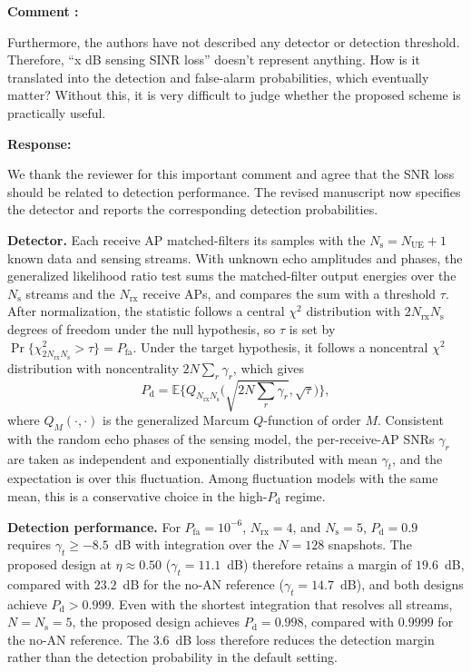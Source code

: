 \documentclass[a4paper,12pt]{article}
\newcounter{reviewcomment}
\newenvironment{reviewcomment}{%
  \stepcounter{reviewcomment}%
  \begin{shaded}
  \textbf{Comment \thereviewcomment:}\par
}{\end{shaded}}
\newenvironment{response}{\par\textbf{Response:}\par}{\par}
\begin{document}
\begin{reviewcomment}
Furthermore, the authors have not described any detector or detection
threshold. Therefore, ``x dB sensing SINR loss'' doesn't represent anything.
How is it translated into the detection and false-alarm probabilities,
which eventually matter? Without this, it is very difficult to judge whether
the proposed scheme is practically useful.
\end{reviewcomment}
\begin{response}
We thank the reviewer for this important comment and agree that the SNR loss
should be related to detection performance. The revised manuscript now
specifies the detector and reports the corresponding detection
probabilities.

\textbf{Detector.} Each receive AP matched-filters its samples with the
$N_{\mathrm{s}}=N_{\mathrm{UE}}+1$ known data and sensing streams. With
unknown echo amplitudes and phases, the generalized likelihood ratio test
sums the matched-filter output energies over the $N_{\mathrm{s}}$ streams and
the $N_{\mathrm{rx}}$ receive APs, and compares the sum with a threshold
$\tau$. After normalization, the statistic follows a central $\chi^2$
distribution with $2N_{\mathrm{rx}}N_{\mathrm{s}}$ degrees of freedom under
the null hypothesis, so $\tau$ is set by
$\Pr\{\chi^2_{2N_{\mathrm{rx}}N_{\mathrm{s}}}>\tau\}=P_{\mathrm{fa}}$. Under
the target hypothesis, it follows a noncentral $\chi^2$ distribution with
noncentrality $2N\sum_r\gamma_r$, which gives
\begin{equation*}
P_{\mathrm{d}}=\mathbb{E}\Big\{Q_{N_{\mathrm{rx}}N_{\mathrm{s}}}\Big(\sqrt{2N{\textstyle\sum_r}\gamma_r},\sqrt{\tau}\Big)\Big\},
\end{equation*}
where $Q_{M}(\cdot,\cdot)$ is the generalized Marcum $Q$-function of order
$M$. Consistent with the random echo phases of the sensing model, the
per-receive-AP SNRs $\gamma_r$ are taken as independent and exponentially
distributed with mean $\gamma_t$, and the expectation is over this
fluctuation. Among fluctuation models with the same mean, this is a
conservative choice in the high-$P_{\mathrm{d}}$ regime.

\textbf{Detection performance.} For $P_{\mathrm{fa}}=10^{-6}$,
$N_{\mathrm{rx}}=4$, and $N_{\mathrm{s}}=5$, $P_{\mathrm{d}}=0.9$ requires
$\gamma_t\ge-8.5$~dB with integration over the $N=128$ snapshots. The
proposed design at $\eta\approx0.50$ ($\gamma_t=11.1$~dB) therefore retains
a margin of $19.6$~dB, compared with $23.2$~dB for the no-AN reference
($\gamma_t=14.7$~dB), and both designs achieve $P_{\mathrm{d}}>0.999$. Even
with the shortest integration that resolves all streams, $N=N_{\mathrm{s}}=5$,
the proposed design achieves $P_{\mathrm{d}}=0.998$, compared with $0.9999$
for the no-AN reference. The $3.6$~dB loss therefore reduces the detection
margin rather than the detection probability in the default setting.


\end{response}
\end{document}
